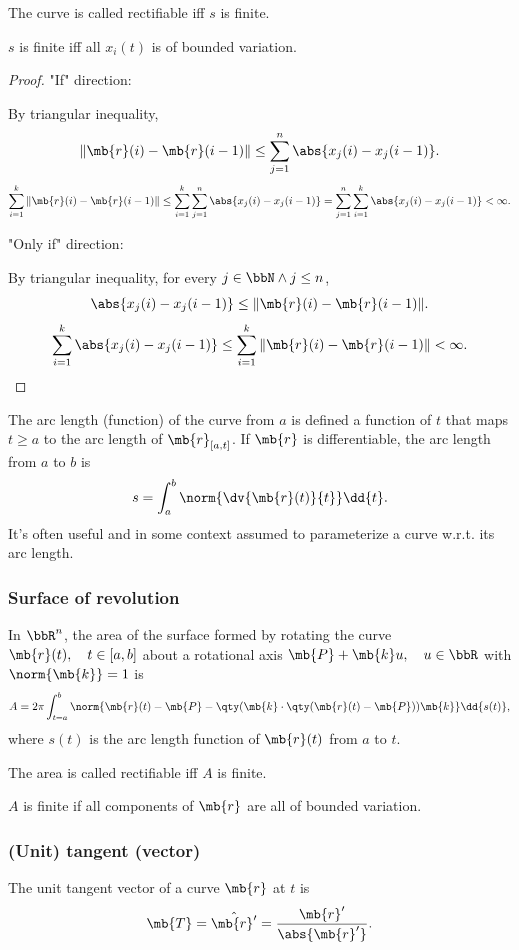The curve is called rectifiable iff $s$ is finite.

$s$ is finite iff all $x_i(t)$ is of bounded variation.
\begin{proof}
"If" direction:

By triangular inequality,
\[\|\mb{r}(i)-\mb{r}(i-1)\|\leq\sum_{j=1}^n\abs{x_j(i)-x_j(i-1)}.\]
\[\sum_{i=1}^k\|\mb{r}(i)-\mb{r}(i-1)\|\leq\sum_{i=1}^k\sum_{j=1}^n\abs{x_j(i)-x_j(i-1)}=\sum_{j=1}^n\sum_{i=1}^k\abs{x_j(i)-x_j(i-1)}<\infty.\]

"Only if" direction:

By triangular inequality, for every $j\in\bbN\land j\leq n$,
\[\abs{x_j(i)-x_j(i-1)}\leq\|\mb{r}(i)-\mb{r}(i-1)\|.\]
\[\sum_{i=1}^k\abs{x_j(i)-x_j(i-1)}\leq\sum_{i=1}^k\|\mb{r}(i)-\mb{r}(i-1)\|<\infty.\]
\end{proof}

The arc length (function) of the curve from $a$ is defined a function of $t$ that maps $t\geq a$ to the arc length of $\mb{r}_{[a,t]}$.
If $\mb{r}$ is differentiable, the arc length from $a$ to $b$ is
\[s=\int_a^b\norm{\dv{\mb{r}(t)}{t}}\dd{t}.\]
It's often useful and in some context assumed to parameterize a curve w.r.t. its arc length.
\subsubsection{Surface of revolution}
In $\bbR^n$, the area of the surface formed by rotating the curve $\mb{r}(t),\quad t\in[a,b]$ about a rotational axis $\mb{P}+\mb{k}u,\quad u\in\bbR$ with $\norm{\mb{k}}=1$ is
\[A=2\pi\int_{t=a}^b\norm{\mb{r}(t)-\mb{P}-\qty(\mb{k}\cdot\qty(\mb{r}(t)-\mb{P}))\mb{k}}\dd{s(t)},\]
where $s(t)$ is the arc length function of $\mb{r}(t)$ from $a$ to $t$.

The area is called rectifiable iff $A$ is finite.

$A$ is finite if all components of $\mb{r}$ are all of bounded variation.
\subsubsection{(Unit) tangent (vector)}
The unit tangent vector of a curve $\mb{r}$ at $t$ is
\[\mb{T}=\hat{\mb{r}'}=\frac{\mb{r}'}{\abs{\mb{r}'}}.\]
